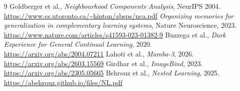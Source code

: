 \documentclass[11pt,a4paper]{article}
\begin{document}
\begin{thebibliography}{9}
 Goldberger et al., \emph{Neighbourhood Components Analysis},
NeurIPS 2004. \url{https://www.cs.utoronto.ca/~hinton/absps/nca.pdf}
 \emph{Organizing memories for generalization in complementary
learning systems}, Nature Neuroscience, 2023.
\url{https://www.nature.com/articles/s41593-023-01382-9}
 Buzzega et al., \emph{Dark Experience for General Continual Learning},
2020. \url{https://arxiv.org/abs/2004.07211}
 Lahoti et al., \emph{Mamba-3}, 2026.
\url{https://arxiv.org/abs/2603.15569}
 Girdhar et al., \emph{ImageBind}, 2023.
\url{https://arxiv.org/abs/2305.05665}
 Behrouz et al., \emph{Nested Learning}, 2025.
\url{https://abehrouz.github.io/files/NL.pdf}
\end{thebibliography}
\end{document}
